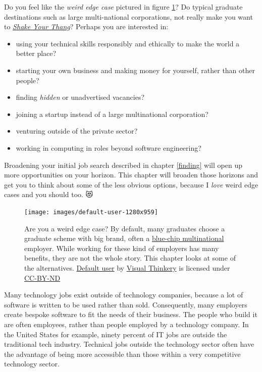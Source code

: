 \documentclass[
]{book}
\providecommand{\tightlist}{%
  \setlength{\itemsep}{0pt}\setlength{\parskip}{0pt}}
\begin{document}
Do you feel like the \emph{weird edge case} pictured in figure \ref{fig:default-user-fig}? Do typical graduate destinations such as large multi-national corporations, not really make you want to \emph{\href{https://en.wikipedia.org/wiki/Shake_Your_Thang}{Shake Your Thang}}? \citep{saltnpepa} Perhaps you are interested in:

\begin{itemize}
\tightlist
\item
  using your technical skills responsibly and ethically to make the world a better place?
\item
  starting your own business and making money for yourself, rather than other people?
\item
  finding \emph{hidden} or unadvertised vacancies?
\item
  joining a startup instead of a large multinational corporation?
\item
  venturing outside of the private sector?
\item
  working in computing in roles beyond software engineering?
\end{itemize}

Broadening your initial job search described in chapter \ref{finding} will open up more opportunities on your horizon. This chapter will broaden those horizons and get you to think about some of the less obvious options, because I \emph{love} weird edge cases and you should too. 😻

\begin{figure}

{\centering \texttt{[image: images/default-user-1280x959]} 

}

\caption{Are you a weird edge case? By default, many graduates choose a graduate scheme with big brand, often a \href{https://en.wikipedia.org/wiki/Blue_chip_(stock_market)}{blue-chip multinational} employer. While working for these kind of employers has many benefits, they are not the whole story. This chapter looks at some of the alternatives. \href{https://bryanmmathers.com/default-user/}{Default user} by \href{https://visualthinkery.com}{Visual Thinkery} is licensed under \href{https://creativecommons.org/licenses/by-nd/4.0/}{CC-BY-ND}}\label{fig:default-user-fig}
\end{figure}



Many technology jobs exist outside of technology companies, \citep{outsideit} because a lot of software is written to be used rather than sold. Consequently, many employers create bespoke software to fit the needs of their business. The people who build it are often employees, rather than people employed by a technology company. In the United States for example, ninety percent of IT jobs are outside the traditional tech industry. Technical jobs outside the technology sector often have the advantage of being more accessible than those within a very competitive technology sector. \citep{burninglass}
\end{document}
